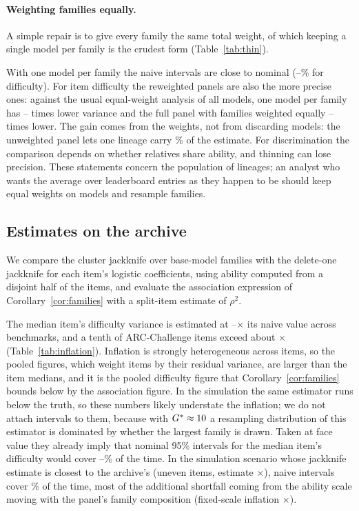 \documentclass[10pt]{article}
\theoremstyle{remark}\newtheorem{remark}{Remark}
\begin{document}
\paragraph{Weighting families equally.}
A simple repair is to give every family the same total weight, of which
keeping a single model per family is the crudest form (Table~\ref{tab:thin}).

With one model per family the naive intervals are close to nominal
(\ThinCoverLo--\ThinCoverHi\% for difficulty). For item difficulty the
reweighted panels are also the more precise ones: against the usual
equal-weight analysis of all models, one model per family has
\ThinGainLo--\ThinGainHi{} times lower variance and the full panel with
families weighted equally \WeightGainLo--\WeightGainHi{} times lower. The gain
comes from the weights, not from discarding models: the unweighted panel lets
one lineage carry \LargestFamilyShare\% of the estimate. For discrimination
the comparison depends on whether relatives share ability, and thinning can
lose precision. These statements concern the population of lineages; an
analyst who wants the average over leaderboard entries as they happen to be
should keep equal weights on models and resample families.

\subsection{Estimates on the archive}\label{sec:archive}
We compare the cluster jackknife over base-model families with the
delete-one jackknife for each item's logistic coefficients, using ability
computed from a disjoint half of the items, and evaluate the association
expression of Corollary~\ref{cor:families} with a split-item estimate of
$\rho^2$.



The median item's difficulty variance is estimated at
\InflMedMin--\InflMedMax$\times$ its naive value across benchmarks, and a
tenth of ARC-Challenge items exceed about \InflARCTop$\times$
(Table~\ref{tab:inflation}). Inflation is strongly heterogeneous across
items, so the pooled figures, which weight items by their residual variance,
are larger than the item medians, and it is the pooled difficulty figure that
Corollary~\ref{cor:families} bounds below by the association figure. In the
simulation the same estimator runs below the truth, so these numbers likely
understate the inflation; we do not attach intervals to them, because with
$G^\ast\approx10$ a resampling distribution of this estimator is
dominated by whether the largest family is drawn. Taken at face value they
already imply that nominal 95\% intervals for the median item's difficulty
would cover \ConsCoverLo--\ConsCoverHi\% of the time. In the simulation
scenario whose jackknife estimate is closest to the archive's (uneven items,
estimate \SimUnevenEst$\times$), naive intervals cover \SimUnevenCover\% of the
time, most of the additional shortfall coming from the ability scale moving
with the panel's family composition (fixed-scale inflation
\SimUnevenFix$\times$).
\end{document}
